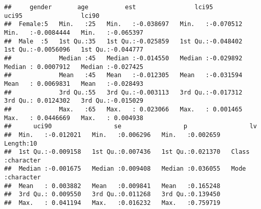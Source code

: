 \documentclass[
]{article}
\begin{document}
\begin{verbatim}
##     gender       age          est                lci95               uci95                lci90          
##  Female:5   Min.   :25   Min.   :-0.038697   Min.   :-0.070512   Min.   :-0.0084444   Min.   :-0.065397  
##  Male  :5   1st Qu.:35   1st Qu.:-0.025859   1st Qu.:-0.048402   1st Qu.:-0.0056096   1st Qu.:-0.044777  
##             Median :45   Median :-0.014550   Median :-0.029892   Median : 0.0007912   Median :-0.027425  
##             Mean   :45   Mean   :-0.012305   Mean   :-0.031594   Mean   : 0.0069831   Mean   :-0.028493  
##             3rd Qu.:55   3rd Qu.:-0.003113   3rd Qu.:-0.017312   3rd Qu.: 0.0124302   3rd Qu.:-0.015029  
##             Max.   :65   Max.   : 0.023066   Max.   : 0.001465   Max.   : 0.0446669   Max.   : 0.004938  
##      uci90                 se                 p                 lv           
##  Min.   :-0.012021   Min.   :0.006296   Min.   :0.002659   Length:10         
##  1st Qu.:-0.009158   1st Qu.:0.007436   1st Qu.:0.021370   Class :character  
##  Median :-0.001675   Median :0.009408   Median :0.036055   Mode  :character  
##  Mean   : 0.003882   Mean   :0.009841   Mean   :0.165248                     
##  3rd Qu.: 0.009550   3rd Qu.:0.011268   3rd Qu.:0.139450                     
##  Max.   : 0.041194   Max.   :0.016232   Max.   :0.759719
\end{verbatim}
\end{document}

